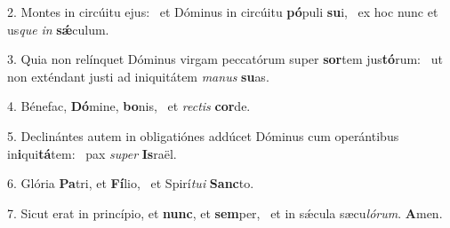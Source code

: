 2. Montes in circúitu ejus: \dag\  et Dóminus in circúitu \textbf{pó}puli \textbf{su}i, \ast\  ex hoc nunc et us\textit{que} \textit{in} \textbf{sǽ}culum.\

3. Quia non relínquet Dóminus virgam peccatórum super \textbf{sor}tem jus\textbf{tó}rum: \ast\  ut non exténdant justi ad iniquitátem \textit{ma}\textit{nus} \textbf{su}as.\

4. Bénefac, \textbf{Dó}mine, \textbf{bo}nis, \ast\  et \textit{rec}\textit{tis} \textbf{cor}de.\

5. Declinántes autem in obligatiónes addúcet Dóminus cum operántibus in\textbf{i}qui\textbf{tá}tem: \ast\  pax \textit{su}\textit{per} \textbf{Is}raël.\

6. Glória \textbf{Pa}tri, et \textbf{Fí}lio, \ast\  et Spirí\textit{tu}\textit{i} \textbf{Sanc}to.\

7. Sicut erat in princípio, et \textbf{nunc}, et \textbf{sem}per, \ast\  et in sǽcula sæcu\textit{ló}\textit{rum}. \textbf{A}men.\

